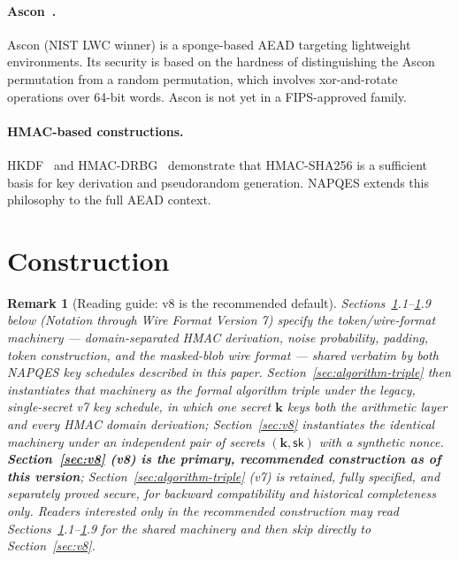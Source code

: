 \documentclass[11pt,a4paper]{article}
\newtheorem{remark}[theorem]{Remark}
\begin{document}
\paragraph{Ascon~\cite{ascon2021}.}
Ascon (NIST LWC winner) is a sponge-based AEAD targeting lightweight
environments.  Its security is based on the hardness of distinguishing the
Ascon permutation from a random permutation, which involves xor-and-rotate
operations over 64-bit words.  Ascon is not yet in a FIPS-approved family.

\paragraph{HMAC-based constructions.}
HKDF~\cite{rfc5869} and HMAC-DRBG~\cite{nist-drbg} demonstrate that
HMAC-SHA256 is a sufficient basis for key derivation and pseudorandom
generation.  NAPQES extends this philosophy to the full AEAD context.

\section{Construction}
\label{sec:construction}

\begin{remark}[Reading guide: v8 is the recommended default]
\label{rem:reading-guide}
Sections~\ref{sec:construction}.1--\ref{sec:construction}.9 below (Notation
through Wire Format Version 7) specify the token/wire-format machinery ---
domain-separated HMAC derivation, noise probability, padding, token
construction, and the masked-blob wire format --- shared verbatim by both
NAPQES key schedules described in this paper. Section~\ref{sec:algorithm-triple}
then instantiates that machinery as the formal algorithm triple
\emph{under the legacy, single-secret v7 key schedule}, in which one secret
$\mathbf{k}$ keys both the arithmetic layer and every HMAC domain
derivation; Section~\ref{sec:v8} instantiates the identical machinery under
an \emph{independent} pair of secrets $(\mathbf{k},\mathsf{sk})$ with a
synthetic nonce. \textbf{Section~\ref{sec:v8} (v8) is the primary,
recommended construction as of this version}; Section~\ref{sec:algorithm-triple}
(v7) is retained, fully specified, and separately proved secure, for
backward compatibility and historical completeness only. Readers
interested only in the recommended construction may read
Sections~\ref{sec:construction}.1--\ref{sec:construction}.9 for the shared
machinery and then skip directly to Section~\ref{sec:v8}.
\end{remark}
\end{document}
